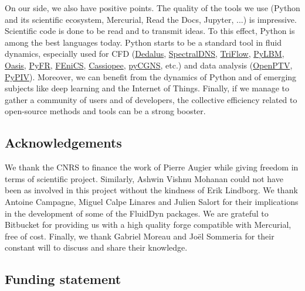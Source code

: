 On our side, we also have positive points.
%
The quality of the tools we use (Python and its scientific ecosystem,
Mercurial, Read the Docs, Jupyter, ...) is impressive.
%
Scientific code is done to be read and to transmit ideas. To this effect, Python
is among the best languages today.
%
Python starts to be a standard tool in fluid dynamics, especially used for CFD
(\href{http://dedalus-project.org/}{Dedalus},
\href{https://github.com/spectralDNS}{SpectralDNS},
\href{https://pypi.org/project/triflow/}{TriFlow},
\href{http://pylbm.readthedocs.io}{PyLBM},
\href{https://github.com/mikaem/Oasis}{Oasis}, \href{http://pyfr.org/}{PyFR},
\href{https://fenicsproject.org/}{FEniCS},
\href{http://elsa.onera.fr/Cassiopee/}{Cassiopee},
\href{https://github.com/pyCGNS}{pyCGNS}, etc.) and data analysis
(\href{http://www.openptv.net/}{OpenPTV},
\href{https://github.com/jr7/pypiv}{PyPIV}).
%
Moreover, we can benefit from the dynamics of Python and of emerging subjects like
deep learning and the Internet of Things.
%
Finally, if we manage to gather a community of users and of developers, the
collective efficiency related to open-source methods and tools can be a strong
booster.

\subsection*{Acknowledgements}


We thank the CNRS to finance the work of Pierre Augier while giving freedom in
terms of scientific project.
%
Similarly, Ashwin Vishnu Mohanan could not have been as involved in this
project without the kindness of Erik Lindborg.
%
We thank Antoine Campagne, Miguel Calpe Linares and Julien Salort for their
implications in the development of some of the FluidDyn packages.
%
We are grateful to Bitbucket for providing us with a high quality forge
compatible with Mercurial, free of cost.
%
Finally, we thank Gabriel Moreau and Jo\"el Sommeria for their constant will
to discuss and share their knowledge.

\subsection*{Funding statement}


